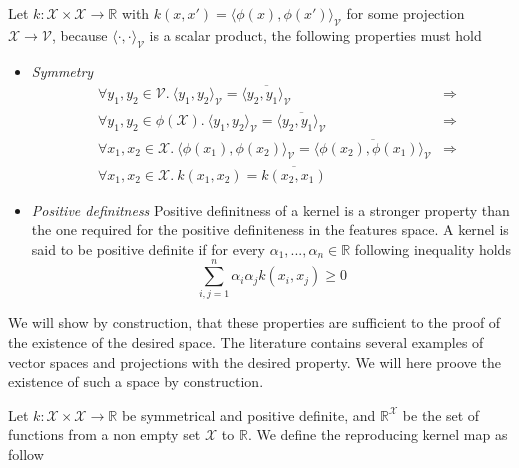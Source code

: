 Let $k :\mathcal{X} \times \mathcal{X} \rightarrow \mathbb{R}$ with $k(x, x') = \langle \phi(x), \phi(x')\rangle _{\mathcal{V}}$ for some projection $\mathcal{X} \rightarrow \mathcal{V}$, because $\langle \cdot, \cdot\rangle _{\mathcal{V}}$ is a scalar product, the following properties must hold

\begin{itemize}
\item \textit{Symmetry}
  \begin{equation*}
    \begin{aligned}
      & \forall y_1, y_2 \in \mathcal{V}.\ 
      \langle y_1, y_2\rangle _{\mathcal{V}} = \overline{\langle y_2, y_1\rangle _{\mathcal{V}}} & \Rightarrow\\
      & \forall y_1, y_2 \in \phi(\mathcal{X}).\ 
      \langle y_1, y_2\rangle _{\mathcal{V}} = \overline{\langle y_2, y_1\rangle _{\mathcal{V}}} & \Rightarrow\\
      &\forall x_1, x_2 \in \mathcal{X}.\ 
      \langle \phi(x_1), \phi(x_2)\rangle _{\mathcal{V}} = \overline{\langle \phi(x_2), \phi(x_1)\rangle _{\mathcal{V}}} &\Rightarrow\\
      &\forall x_1, x_2 \in \mathcal{X}.\ 
         k\left(x_1, x_2\right) = \overline{k\left(x_2, x_1\right)}
    \end{aligned}
  \end{equation*}

\item \textit{Positive definitness} Positive definitness of a kernel is a stronger property than the one required for the positive definiteness in the features space. A kernel is said to be positive definite if for every $\alpha_1, ..., \alpha_n \in \mathbb{R}$ following inequality holds
  \begin{equation*}
    \sum_{i,j=1}^n\alpha_i\alpha_jk\left(x_i, x_j\right) \geq 0
  \end{equation*}
\end{itemize}

We will show by construction, that these properties are sufficient to the proof of the existence of the desired space. The literature contains several examples of vector spaces and projections with the desired property. We will here proove the existence of such a space by construction.

Let $k : \mathcal{X} \times \mathcal{X} \rightarrow \mathbb{R}$ be symmetrical and positive definite, and $\mathbb{R}^{\mathcal{X}}$ be the set of functions from a non empty set $\mathcal{X}$ to $\mathbb{R}$. We define the reproducing kernel map as follow

